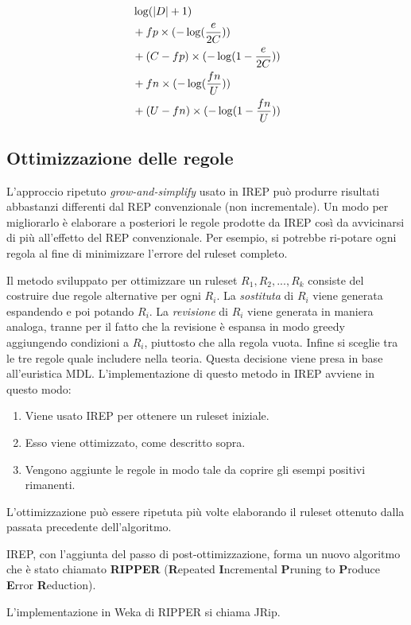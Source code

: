 \begin{align*}
	  & \log(|D| + 1)                                  \\
	  & + fp \times (-\log(\dfrac{e}{2C}))             \\
	  & + (C - fp) \times (-\log(1 - \-\dfrac{e}{2C})) \\
	  & + fn \times (-\log(\dfrac{fn}{U}))             \\
	  & + (U - fn) \times (-\log(1 - \dfrac{fn}{U}))   \\	
\end{align*}


\subsection*{Ottimizzazione delle regole}
L'approccio ripetuto \textit{grow-and-simplify} usato in IREP può produrre risultati abbastanzi differenti dal REP convenzionale (non incrementale). Un modo per migliorarlo è elaborare a posteriori le regole prodotte da IREP così da avvicinarsi di più all'effetto del REP convenzionale. Per esempio, si potrebbe ri-potare ogni regola al fine di minimizzare l'errore del ruleset completo.

Il metodo sviluppato per ottimizzare un ruleset $R_1,R_2,...,R_k$ consiste del costruire due regole alternative per ogni $R_i$. La \textit{sostituta} di $R_i$ viene generata espandendo e poi potando $R_i$. La \textit{revisione} di $R_i$ viene generata in maniera analoga, tranne per il fatto che la revisione è espansa in modo greedy aggiungendo condizioni a $R_i$, piuttosto che alla regola vuota. Infine si sceglie tra le tre regole quale includere nella teoria. Questa decisione viene presa in base all'euristica MDL. L'implementazione di questo metodo in IREP avviene in questo modo:
\begin{enumerate}
	\item Viene usato IREP per ottenere un ruleset iniziale.
	\item Esso viene ottimizzato, come descritto sopra.
	\item Vengono aggiunte le regole in modo tale da coprire gli esempi positivi rimanenti.
\end{enumerate}

L'ottimizzazione può essere ripetuta più volte elaborando il ruleset ottenuto dalla passata precedente dell'algoritmo.

IREP, con l'aggiunta del passo di post-ottimizzazione, forma un nuovo algoritmo che è stato chiamato \textbf{RIPPER} (\textbf{R}epeated \textbf{I}ncremental \textbf{P}runing to \textbf{P}roduce \textbf{E}rror \textbf{R}eduction).

L'implementazione in Weka di RIPPER si chiama JRip.